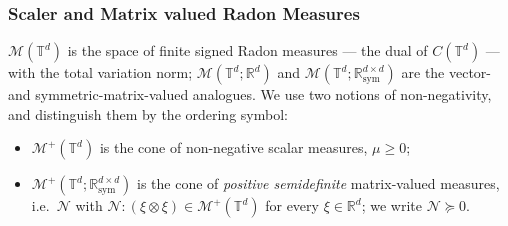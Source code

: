 \documentclass[12pt,a4paper,twoside]{article}
\numberwithin{equation}{section}%
\begin{document}
\subsubsection*{Scaler and Matrix valued Radon Measures}



$\mathcal M(\mathbb T^d)$ is the space of finite signed Radon measures --- the dual of $C(\mathbb T^d)$ --- with the total variation norm; $\mathcal M(\mathbb T^d;\mathbb R^d)$ and $\mathcal M(\mathbb T^d;\mathbb R^{d\times d}_{\mathrm{sym}})$ are the vector- and symmetric-matrix-valued analogues. We use two notions of non-negativity, and distinguish them by the ordering symbol:
\begin{itemize}
	\item $\mathcal M^+(\mathbb T^d)$ is the cone of non-negative scalar measures, $\mu\ge0$;
	\item $\mathcal M^+(\mathbb T^d;\mathbb R^{d\times d}_{\mathrm{sym}})$ is the cone of \emph{positive semidefinite} matrix-valued measures, i.e.\ $\mathcal N$ with $\mathcal N:(\xi\otimes\xi)\in\mathcal M^+(\mathbb T^d)$ for every $\xi\in\mathbb R^d$; we write $\mathcal N\succeq0$.
\end{itemize}
\end{document}
